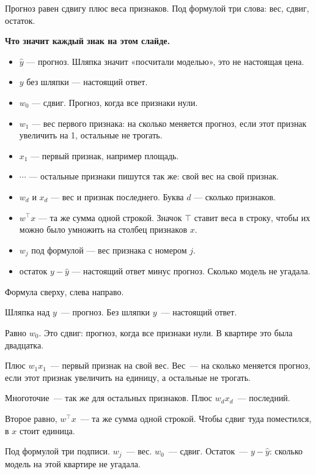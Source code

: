 \documentclass[11pt,a4paper]{article}
\newcommand{\slidehead}[2]{\par\vspace{4mm}{\color{navy}\large\bfseries Слайд #1. #2}\par\vspace{1mm}}
\newcommand{\screen}[1]{\par{\color{ink}\small #1\par}\vspace{1mm}}
\newcommand{\say}[1]{\begin{saybox}#1\end{saybox}}
\newenvironment{signs}{\begin{signbox}{\bfseries Что значит каждый знак на этом слайде.}\par\begin{itemize}[leftmargin=1.15em,itemsep=2pt,topsep=3pt,parsep=0pt]}{\end{itemize}\end{signbox}}
\begin{document}
\slidehead{7}{Формула прогноза}
\screen{Прогноз равен сдвигу плюс веса признаков. Под формулой три слова: вес, сдвиг, остаток.}
\begin{signs}
\item \(\hat y\) — прогноз. Шляпка значит «посчитали моделью», это не настоящая цена.
\item \(y\) без шляпки — настоящий ответ.
\item \(w_0\) — сдвиг. Прогноз, когда все признаки нули.
\item \(w_1\) — вес первого признака: на сколько меняется прогноз, если этот признак увеличить на 1, остальные не трогать.
\item \(x_1\) — первый признак, например площадь.
\item \(\cdots\) — остальные признаки пишутся так же: свой вес на свой признак.
\item \(w_d\) и \(x_d\) — вес и признак последнего. Буква \(d\) — сколько признаков.
\item \(w^{\top}x\) — та же сумма одной строкой. Значок \(\top\) ставит веса в строку, чтобы их можно было умножить на столбец признаков \(x\).
\item \(w_j\) под формулой — вес признака с номером \(j\).
\item остаток \(y-\hat y\) — настоящий ответ минус прогноз. Сколько модель не угадала.
\end{signs}
\say{Формула сверху, слева направо.

Шляпка над \(y\)~--- прогноз. Без шляпки \(y\)~--- настоящий ответ.

Равно \(w_0\). Это сдвиг: прогноз, когда все признаки нули. В квартире это была двадцатка.

Плюс \(w_1 x_1\)~--- первый признак на свой вес. Вес~--- на сколько меняется прогноз, если этот признак увеличить на единицу, а остальные не трогать.

Многоточие~--- так же для остальных признаков. Плюс \(w_d x_d\)~--- последний.

Второе равно, \(w^{\top}x\)~--- та же сумма одной строкой. Чтобы сдвиг туда поместился, в \(x\) стоит единица.

Под формулой три подписи. \(w_j\)~--- вес. \(w_0\)~--- сдвиг. Остаток~--- \(y-\hat y\): сколько модель на этой квартире не угадала.}
\end{document}
